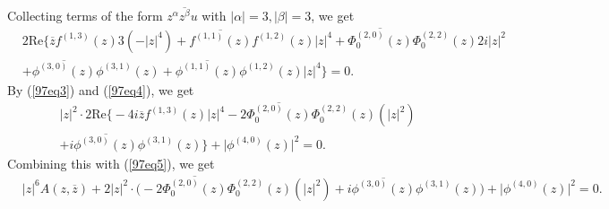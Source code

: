 \documentclass[12pt]{article}
\numberwithin{equation}{section}
\def\a{\alpha}
\def\ov{\overline}
\def\b{\beta}
\def\a{\alpha}
\def\a{\alpha}
\def\b{\beta}
\def\a{\alpha}
\def\a{\alpha}
\begin{document}
Collecting terms of the form $z^{\a}\ov{z^{\b}}u$ with
$|\a|=3,|\b|=3$, we get
\begin{equation}\begin{split}\label{97eq5}
&2\text{Re}\Big\{\ov{z}f^{(1,3)}(z)3(-|z|^4)+\ov{f^{(1,1)}(z)}f^{(1,2)}(z)|z|^4
+ \ov{\Phi_0^{(2,0)}(z)}\Phi_0^{(2,2)}(z)2i|z|^2
\\&+\ov{\phi^{(3,0)}(z)}\phi^{(3,1)}(z)+
\ov{\phi^{(1,1)}(z)}\phi^{(1,2)}(z)|z|^4\Big\}=0.
\end{split}\end{equation}
By (\ref{97eq3}) and (\ref{97eq4}), we get
\begin{equation}\begin{split}\label{93eq1}
&|z|^2\cdot
2\text{Re}\Big\{-4i\ov{z}f^{(1,3)}(z)|z|^4-2\ov{\Phi_0^{(2,0)}(z)}\Phi_0^{(2,2)}(z)(|z|^2)\\
&+
i\ov{\phi^{(3,0)}(z)}\phi^{(3,1)}(z)\Big\}+\big|\phi^{(4,0)}(z)\big|^2=0.
\end{split}\end{equation}
Combining this with (\ref{97eq5}), we get
\begin{equation}\begin{split}\label{98eq1}
&|z|^6A(z,\ov{z})+2|z|^2\cdot\big(
-2\ov{\Phi_0^{(2,0)}(z)}\Phi_0^{(2,2)}(z)(|z|^2)+
i\ov{\phi^{(3,0)}(z)}\phi^{(3,1)}(z)\big)+\big|\phi^{(4,0)}(z)\big|^2=0.
\end{split}\end{equation}
\end{document}
